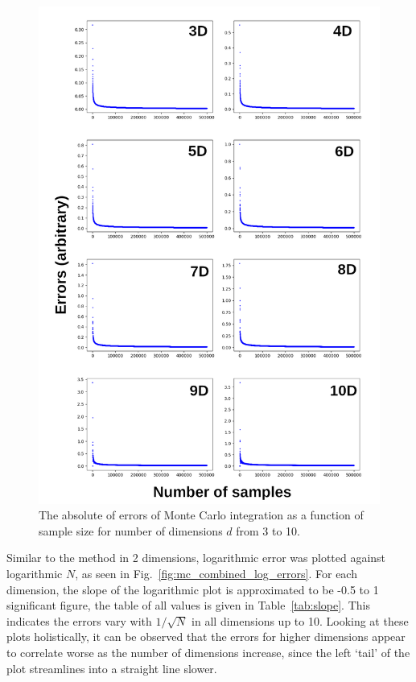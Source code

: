 \documentclass[hyphens,twocolumn,nobalancelastpage,aps,10pt,citeautoscript,longbibliography]{revtex4-2}
\begin{document}
\begin{figure}[htpb] \centering
	\includegraphics[width=1\linewidth]{./assets/monte_carlo/combined_errors.png}
	\caption{The absolute of errors of Monte Carlo integration as a function of sample size for number of dimensions $d$ from 3 to 10.}%
	\label{fig:mc_combined_errors}
\end{figure}

Similar to the method in 2 dimensions, logarithmic error was plotted against
logarithmic $N$, as seen in Fig.~\ref{fig:mc_combined_log_errors}. For each
dimension, the slope of the logarithmic plot is approximated to be -0.5 to 1
significant figure, the table of all values is given in Table~\ref{tab:slope}.
This indicates the errors vary with $1/\sqrt{N}$ in all dimensions up to 10.
Looking at these plots holistically, it can be observed that the errors for
higher dimensions appear to correlate worse as the number of dimensions
increase, since the left `tail' of the plot streamlines into a straight line
slower.
\end{document}
